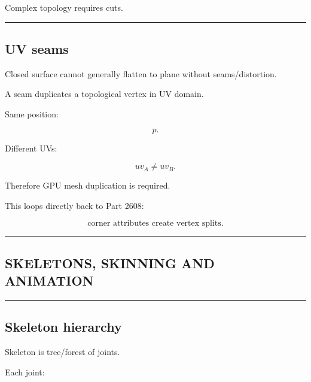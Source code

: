 Complex topology requires cuts.

\begin{center}\rule{0.5\linewidth}{0.5pt}\end{center}

\subsection{UV seams}\label{04-visual-computing-ii-ch041-uv-seams}

\hypertarget{04-visual-computing-ii-ch041-uv-seams}{}

Closed surface cannot generally flatten to plane without seams/distortion.

A seam duplicates a topological vertex in UV domain.

Same position:

\[
p.
\]

Different UVs:

\[
uv_A\ne uv_B.
\]

Therefore GPU mesh duplication is required.

This loops directly back to Part 2608:

\[
\boxed{
\text{corner attributes create vertex splits}.
}
\]

\begin{center}\rule{0.5\linewidth}{0.5pt}\end{center}

\subsection{SKELETONS, SKINNING AND ANIMATION}\label{04-visual-computing-ii-ch041-skeletons-skinning-and-animation}

\hypertarget{04-visual-computing-ii-ch041-skeletons-skinning-and-animation}{}

\begin{center}\rule{0.5\linewidth}{0.5pt}\end{center}

\subsection{Skeleton hierarchy}\label{04-visual-computing-ii-ch041-skeleton-hierarchy}

\hypertarget{04-visual-computing-ii-ch041-skeleton-hierarchy}{}

Skeleton is tree/forest of joints.

Each joint:

